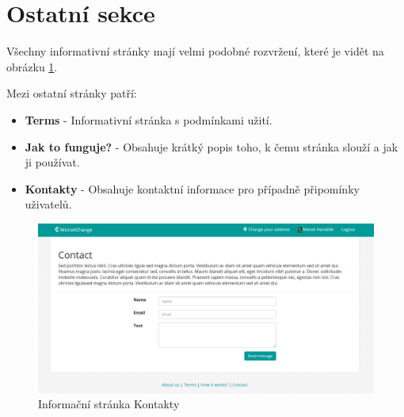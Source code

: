 \section{Ostatní sekce}
\label{nur:other-sections}

Všechny informativní stránky mají velmi podobné rozvržení, které je vidět na obrázku \ref{fig:tur:contact}.

Mezi ostatní stránky patří:
\begin{itemize}
    \item \textbf{Terms} - Informativní stránka s podmínkami užití.
    \item \textbf{Jak to funguje?} - Obsahuje krátký popis toho, k čemu stránka slouží a jak ji používat.
    \item \textbf{Kontakty} - Obsahuje kontaktní informace pro případně připomínky uživatelů.
\end{itemize}

\begin{figure}[h]
    \centering
    \includegraphics[width=1.0\textwidth]{media/tur/contact.png}
    \caption{Informační stránka Kontakty}
    \label{fig:tur:contact}
\end{figure}